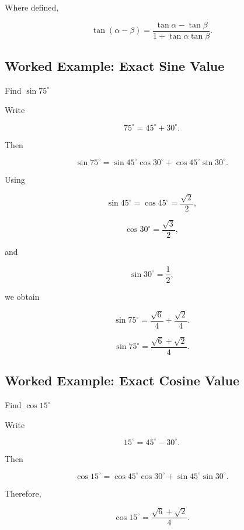 Where defined,

\[
\boxed{
\tan(\alpha-\beta)
=
\frac{
\tan\alpha-\tan\beta
}{
1+\tan\alpha\tan\beta
}.
}
\]

\subsection{Worked Example: Exact Sine Value}
\label{subsec:worked-sine-sum}

\begin{workedexamplebox}{Find \(\sin75^\circ\)}

Write

\[
75^\circ
=
45^\circ+30^\circ.
\]

Then

\[
\sin75^\circ
=
\sin45^\circ\cos30^\circ
+
\cos45^\circ\sin30^\circ.
\]

Using

\[
\sin45^\circ
=
\cos45^\circ
=
\frac{\sqrt2}{2},
\]

\[
\cos30^\circ
=
\frac{\sqrt3}{2},
\]

and

\[
\sin30^\circ
=
\frac12,
\]

we obtain

\[
\sin75^\circ
=
\frac{\sqrt6}{4}
+
\frac{\sqrt2}{4}.
\]

\begin{answerbox}
\[
\boxed{
\sin75^\circ
=
\frac{
\sqrt6+\sqrt2
}{4}.
}
\]
\end{answerbox}

\end{workedexamplebox}

\subsection{Worked Example: Exact Cosine Value}
\label{subsec:worked-cosine-difference}

\begin{workedexamplebox}{Find \(\cos15^\circ\)}

Write

\[
15^\circ
=
45^\circ-30^\circ.
\]

Then

\[
\cos15^\circ
=
\cos45^\circ\cos30^\circ
+
\sin45^\circ\sin30^\circ.
\]

Therefore,

\begin{answerbox}
\[
\boxed{
\cos15^\circ
=
\frac{
\sqrt6+\sqrt2
}{4}.
}
\]
\end{answerbox}

\end{workedexamplebox}

